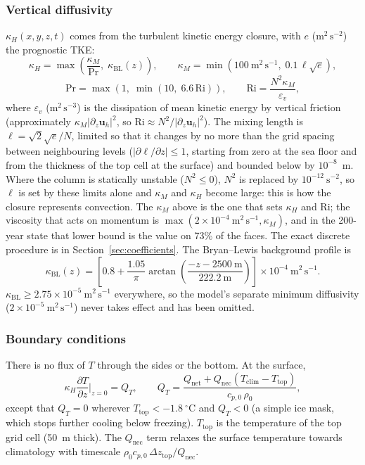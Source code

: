\documentclass{article}
\begin{document}
\subsubsection*{Vertical diffusivity}
$\kappa_H(x,y,z,t)$ comes from the turbulent kinetic energy closure, with $e$ ($\text{m}^2\,\text{s}^{-2}$) the prognostic TKE:
\[
\kappa_H = \max\!\left( \frac{\kappa_M}{\text{Pr}},\; \kappa_\text{BL}(z) \right),
\qquad
\kappa_M = \min\!\left( 100~\text{m}^2\,\text{s}^{-1},\; 0.1\, \ell \sqrt{e} \right),
\]
\[
\text{Pr} = \max\!\left( 1,\; \min\!\left( 10,\; 6.6\, \text{Ri} \right) \right),
\qquad
\text{Ri} = \frac{N^2 \kappa_M}{\varepsilon_v},
\]
where $\varepsilon_v$ ($\text{m}^2\,\text{s}^{-3}$) is the dissipation of mean kinetic energy by vertical friction (approximately $\kappa_M |\partial_z \mathbf{u}_h|^2$, so $\text{Ri} \approx N^2 / |\partial_z \mathbf{u}_h|^2$).
The mixing length is $\ell = \sqrt{2}\sqrt{e}/N$, limited so that it changes by no more than the grid spacing between neighbouring levels ($|\partial \ell/\partial z| \le 1$, starting from zero at the sea floor and from the thickness of the top cell at the surface) and bounded below by $10^{-8}$~m.
Where the column is statically unstable ($N^2 \le 0$), $N^2$ is replaced by $10^{-12}~\text{s}^{-2}$, so $\ell$ is set by these limits alone and $\kappa_M$ and $\kappa_H$ become large: this is how the closure represents convection.
The $\kappa_M$ above is the one that sets $\kappa_H$ and $\text{Ri}$; the viscosity that acts on momentum is $\max(2\times10^{-4}~\text{m}^2\,\text{s}^{-1}, \kappa_M)$, and in the 200-year state that lower bound is the value on 73\% of the faces.
The exact discrete procedure is in Section~\ref{sec:coefficients}.
The Bryan--Lewis background profile \citep{bryanlewis1979} is
\[
\kappa_\text{BL}(z) = \left[ 0.8 + \frac{1.05}{\pi} \arctan\!\left( \frac{-z - 2500~\text{m}}{222.2~\text{m}} \right) \right] \times 10^{-4}~\text{m}^2\,\text{s}^{-1}.
\]
$\kappa_\text{BL} \ge 2.75\times10^{-5}~\text{m}^2\,\text{s}^{-1}$ everywhere, so the model's separate minimum diffusivity ($2\times10^{-5}~\text{m}^2\,\text{s}^{-1}$) never takes effect and has been omitted.

\subsubsection*{Boundary conditions}
There is no flux of $T$ through the sides or the bottom. At the surface,
\[
\kappa_H \frac{\partial T}{\partial z}\bigg|_{z=0} = Q_T,
\qquad
Q_T = \frac{Q_\text{net} + Q_\text{nec}\left( T_\text{clim} - T_\text{top} \right)}{c_{p,0}\, \rho_0},
\]
except that $Q_T = 0$ wherever $T_\text{top} < -1.8~^\circ$C and $Q_T < 0$ (a simple ice mask, which stops further cooling below freezing).
$T_\text{top}$ is the temperature of the top grid cell (50~m thick).
The $Q_\text{nec}$ term relaxes the surface temperature towards climatology with timescale $\rho_0 c_{p,0}\, \Delta z_\text{top} / Q_\text{nec}$.
\end{document}
